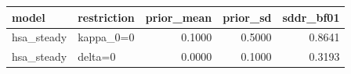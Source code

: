 \begin{tabular}{llrrr}
\toprule
model & restriction & prior\_mean & prior\_sd & sddr\_bf01 \\
\midrule
hsa\_steady & kappa\_0=0 & 0.1000 & 0.5000 & 0.8641 \\
hsa\_steady & delta=0 & 0.0000 & 0.1000 & 0.3193 \\
\bottomrule
\end{tabular}
